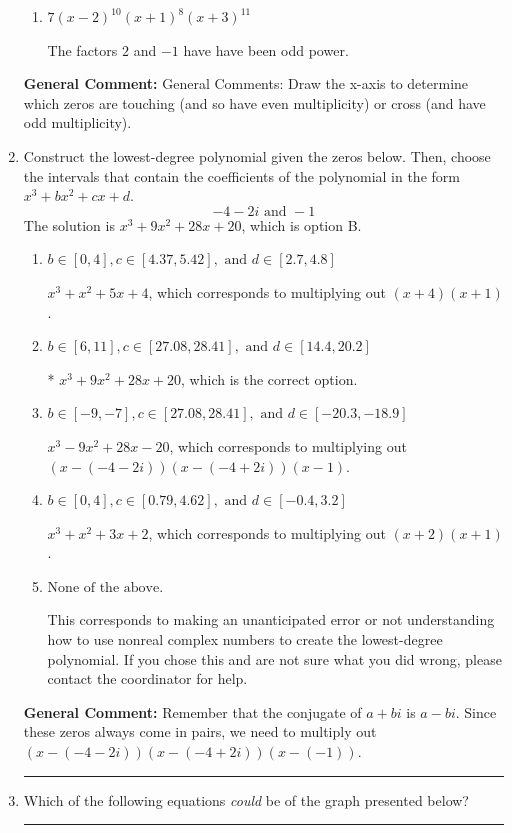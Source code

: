 \documentclass{extbook}[14pt]
\newcommand{\litem}[1]{\item #1

\rule{\textwidth}{0.4pt}}
\begin{document}
\begin{enumerate}
{\begin{enumerate}[label=\Alph*.]
This corresponds to the leading coefficient being the opposite value than it should be.
\item \( 7(x - 2)^{10} (x + 1)^{8} (x + 3)^{11} \)

The factors $2$ and $-1$ have have been odd power.
\end{enumerate}

\textbf{General Comment:} General Comments: Draw the x-axis to determine which zeros are touching (and so have even multiplicity) or cross (and have odd multiplicity).
}
\litem{
Construct the lowest-degree polynomial given the zeros below. Then, choose the intervals that contain the coefficients of the polynomial in the form $x^3+bx^2+cx+d$.
\[ -4 - 2 i \text{ and } -1 \]The solution is \( x^{3} +9 x^{2} +28 x + 20 \), which is option B.\begin{enumerate}[label=\Alph*.]
\item \( b \in [0, 4], c \in [4.37, 5.42], \text{ and } d \in [2.7, 4.8] \)

$x^{3} + x^{2} +5 x + 4$, which corresponds to multiplying out $(x + 4)(x + 1)$.
\item \( b \in [6, 11], c \in [27.08, 28.41], \text{ and } d \in [14.4, 20.2] \)

* $x^{3} +9 x^{2} +28 x + 20$, which is the correct option.
\item \( b \in [-9, -7], c \in [27.08, 28.41], \text{ and } d \in [-20.3, -18.9] \)

$x^{3} -9 x^{2} +28 x -20$, which corresponds to multiplying out $(x-(-4 - 2 i))(x-(-4 + 2 i))(x -1)$.
\item \( b \in [0, 4], c \in [0.79, 4.62], \text{ and } d \in [-0.4, 3.2] \)

$x^{3} + x^{2} +3 x + 2$, which corresponds to multiplying out $(x + 2)(x + 1)$.
\item \( \text{None of the above.} \)

This corresponds to making an unanticipated error or not understanding how to use nonreal complex numbers to create the lowest-degree polynomial. If you chose this and are not sure what you did wrong, please contact the coordinator for help.
\end{enumerate}

\textbf{General Comment:} Remember that the conjugate of $a+bi$ is $a-bi$. Since these zeros always come in pairs, we need to multiply out $(x-(-4 - 2 i))(x-(-4 + 2 i))(x-(-1))$.
}
\litem{
Which of the following equations \textit{could} be of the graph presented below?

}
\end{enumerate}
\end{document}
